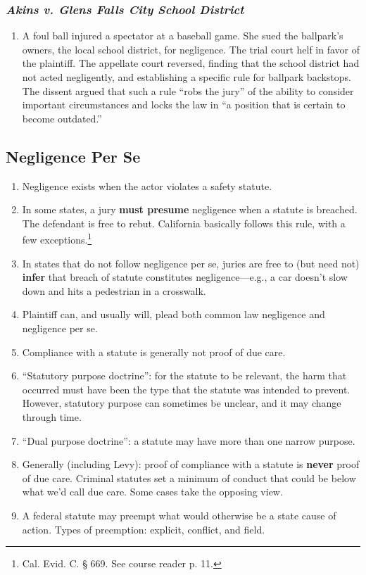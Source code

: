\subsubsection{\emph{Akins v. Glens Falls City School District}}

\begin{enumerate}
    \item A foul ball injured a spectator at a baseball game. She sued the ballpark's owners, the local school district, for negligence. The trial court helf in favor of the plaintiff. The appellate court reversed, finding that the school district had not acted negligently, and establishing a specific rule for ballpark backstops. The dissent argued that such a rule ``robs the jury'' of the ability to consider important circumstances and locks the law in ``a position that is certain to become outdated.''
\end{enumerate}

\subsection{Negligence Per Se}

\begin{enumerate}
    \item Negligence exists when the actor violates a safety statute.
    \item In some states, a jury \textbf{must presume} negligence when a statute is breached. The defendant is free to rebut. California basically follows this rule, with a few exceptions.\footnote{Cal. Evid. C. § 669. See course reader p. 11.} 
    \item In states that do not follow negligence per se, juries are free to (but need not) \textbf{infer} that breach of statute constitutes negligence---e.g., a car doesn't slow down and hits a pedestrian in a crosswalk.
    \item Plaintiff can, and usually will, plead both common law negligence and negligence per se.
    \item Compliance with a statute is generally not proof of due care.
    \item ``Statutory purpose doctrine'': for the statute to be relevant, the harm that occurred must have been the type that the statute was intended to prevent. However, statutory purpose can sometimes be unclear, and it may change through time.
    \item ``Dual purpose doctrine'': a statute may have more than one narrow purpose.
    \item Generally (including Levy): proof of compliance with a statute is \textbf{never} proof of due care. Criminal statutes set a minimum of conduct that could be below what we'd call due care. Some cases take the opposing view.
    \item A federal statute may preempt what would otherwise be a state cause of action. Types of preemption: explicit, conflict, and field.
\end{enumerate}

